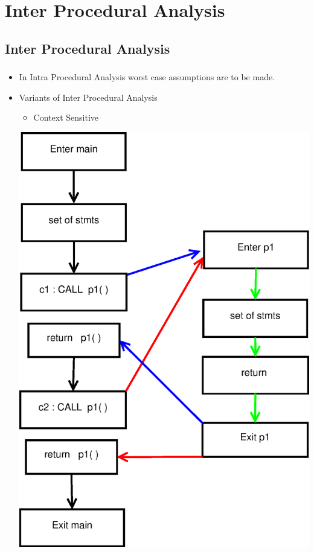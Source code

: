 \documentclass[mathserif,10pt]{beamer}
\begin{document}
%     
%   
%   

\section{Inter Procedural Analysis}

\subsection{Inter Procedural Analysis}
\frame
{
  \frametitle{\subsecname}
  \begin{itemize}
   \item In Intra Procedural Analysis worst case assumptions are to be made. \pause
   \item Variants of Inter Procedural Analysis \\
	\begin{itemize}
	 \item Context Sensitive
	\end{itemize}
	\centering  \includegraphics[scale=0.25]{Figures/Diagram1.eps}                 
  \end{itemize}

}
\end{document}
